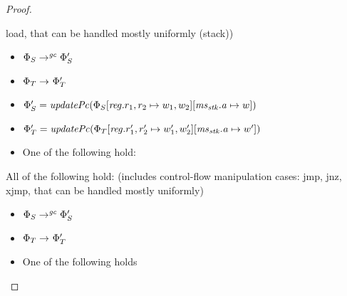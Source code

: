 \begin{proof}
\begin{enumproof}
    load, that can be handled mostly uniformly (stack))
    \begin{itemize}
    \item $\Phi_S \step[\gc]\Phi_S'$
    \item $\Phi_T \step \Phi_T'$
    \item $\Phi_S' =
      \updPcAddr{\Phi_S\updReg{r_1,r_2}{w_1,w_2}\update{\ms_\stk.\aaddr}{w}}$
    \item $\Phi_T' =
      \updPcAddr{\Phi_T\updReg{r_1',r_2'}{w_1',w_2'}\update{\ms_\stk.\aaddr}{w'}}$
    \item One of the following hold:
    \end{itemize}
  \item \label{case:ftlr:store-load-jump} All of the following hold: (includes control-flow manipulation cases:
    jmp, jnz, xjmp, that can be handled mostly uniformly)
    \begin{itemize}
    \item $\Phi_S \step[\gc] \Phi_S'$
    \item $\Phi_T \step \Phi_T'$
    \item One of the following holds
      \begin{enumproof}

\end{enumproof}
\end{itemize}
\end{enumproof}
\end{proof}
